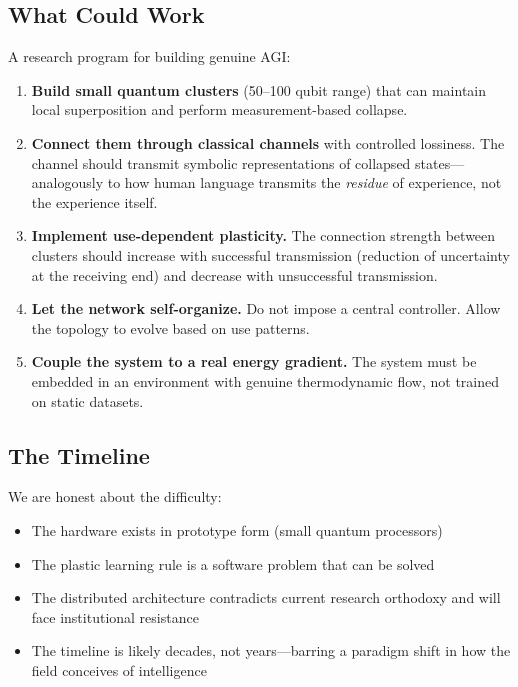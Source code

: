 \documentclass[11pt,a4paper]{article}
\begin{document}
\subsection{What Could Work}

A research program for building genuine AGI:

\begin{enumerate}
    \item \textbf{Build small quantum clusters} (50--100 qubit range) that can maintain local superposition and perform measurement-based collapse.
    \item \textbf{Connect them through classical channels} with controlled lossiness. The channel should transmit symbolic representations of collapsed states---analogously to how human language transmits the \emph{residue} of experience, not the experience itself.
    \item \textbf{Implement use-dependent plasticity.} The connection strength between clusters should increase with successful transmission (reduction of uncertainty at the receiving end) and decrease with unsuccessful transmission.
    \item \textbf{Let the network self-organize.} Do not impose a central controller. Allow the topology to evolve based on use patterns.
    \item \textbf{Couple the system to a real energy gradient.} The system must be embedded in an environment with genuine thermodynamic flow, not trained on static datasets.
\end{enumerate}

\subsection{The Timeline}

We are honest about the difficulty:

\begin{itemize}
    \item The hardware exists in prototype form (small quantum processors)
    \item The plastic learning rule is a software problem that can be solved
    \item The distributed architecture contradicts current research orthodoxy and will face institutional resistance
    \item The timeline is likely decades, not years---barring a paradigm shift in how the field conceives of intelligence
\end{itemize}
\end{document}
